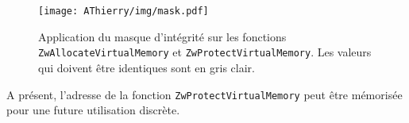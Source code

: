 \begin{figure}
\begin{center}
 \texttt{[image: AThierry/img/mask.pdf]}
\end{center}
\caption{Application du masque d'intégrité sur les fonctions \texttt{ZwAllocateVirtualMemory} et \texttt{ZwProtectVirtualMemory}. Les valeurs qui doivent être identiques sont en gris clair.}
\label{fig:AThierry_matching}
\end{figure}



A présent, l'adresse de la fonction \texttt{ZwProtectVirtualMemory} peut être mémorisée pour une future utilisation discrète. 

